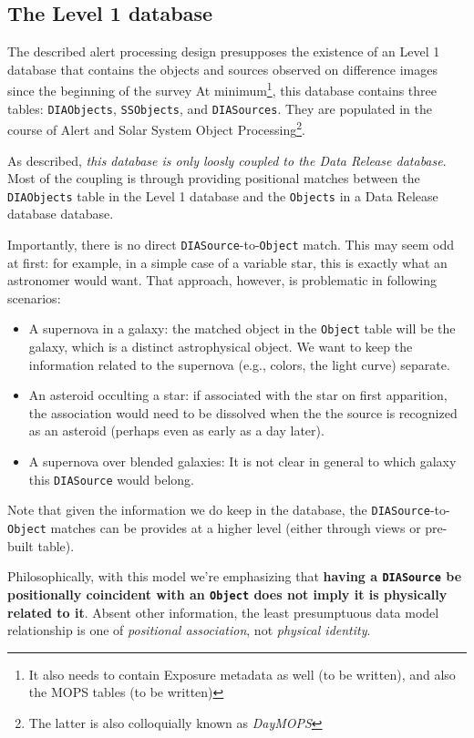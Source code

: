 \documentclass[12pt]{article}
\newcommand{\code}[1]{\texttt{#1}}
\newcommand{\DIASource}{\code{DIASource}\xspace}
\newcommand{\DIASources}{\code{DIASources}\xspace}
\newcommand{\DIAObjects}{\code{DIAObjects}\xspace}
\newcommand{\DB}{{Level 1 database}\xspace}
\newcommand{\DR}{{Data Release database}\xspace}
\newcommand{\Object}{\code{Object}\xspace}
\newcommand{\Objects}{\code{Objects}\xspace}
\newcommand{\SSObjects}{\code{SSObjects}\xspace}
\begin{document}
\subsection{The \DB}
\label{sec:level1db}

The described alert processing design presupposes the existence of an \DB that contains the objects and sources observed on difference images since the beginning of the survey At minimum\footnote{It also needs to contain Exposure metadata as well (to be written), and also the MOPS tables (to be written)}, this database contains three tables: \DIAObjects, \SSObjects, and \DIASources. They are populated in the course of Alert and Solar System Object Processing\footnote{The latter is also colloquially known as {\em DayMOPS}}.

As described, {\em this database is only loosly coupled to the \DR}. Most of the coupling is through providing positional matches between the \DIAObjects table in the \DB and the \Objects in a \DR database.

Importantly, there is no direct \DIASource-to-\Object match. This may seem odd at first: for example, in a simple case of a variable star, this is exactly what an astronomer would want. That approach, however, is problematic in following scenarios:
\begin{itemize}
\item A supernova in a galaxy: the matched object in the \Object table will be the galaxy, which is a distinct astrophysical object. We want to keep the information related to the supernova (e.g., colors, the light curve) separate.
\item An asteroid occulting a star: if associated with the star on first apparition, the association would need to be dissolved when the the source is recognized as an asteroid (perhaps even as early as a day later).
\item A supernova over blended galaxies: It is not clear in general to which galaxy this \DIASource would belong.
\end{itemize}
Note that given the information we do keep in the database, the \DIASource-to-\Object matches can be provides at a higher level (either through views or pre-built table).

Philosophically, with this model we're emphasizing that {\bf having a \DIASource be positionally coincident with an \Object does not imply it is physically related to it}. Absent other information, the least presumptuous data model relationship is one of {\em positional association}, not {\em physical identity}.
\end{document}
